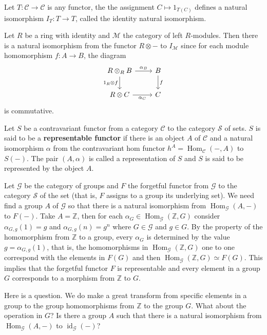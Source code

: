 \documentclass{article}
\DeclareMathOperator{\Hom}{Hom}
\begin{document}
\begin{example}
    Let $T:\mathscr{C}\to \mathscr{C}$ is any functor, the the assignment $C \mapsto 1_{T(C)}$ defines a natural isomorphism $I_T: T\to T$, called the identity natural isomorphism.
\end{example}

\begin{example}
    Let $R$ be a ring with identity and $\mathscr{M}$ the category of left $R$-modules. Then there is a natural isomorphism from the functor $R \otimes -$ to $I_{\mathscr{M}}$ since for each module homomorphism $f:A\to B$, the diagram 
    \begin{equation*}
        \begin{tikzcd}
        R \otimes_R B \arrow[r, "\alpha_B"] \arrow[d, "1_R \otimes f"'] & B \arrow[d, "f"] \\
        R \otimes C \arrow[r, "\alpha_C"']                             & C
        \end{tikzcd}
    \end{equation*}
    is commutative.
\end{example}

\begin{definition}
    Let $S$ be a contravariant functor from a category $\mathscr{C}$ to the category $\mathscr{S}$ of sets. $S$ is said to be a \textbf{representable functor} if there is an object $A$ of $\mathscr{C}$ and a natural isomorphism $\alpha$ from the contravariant hom functor $h^A=\Hom_{\mathscr{C}}(-,A)$ to $S(-)$. The pair $(A,\alpha)$ is called a representation of $S$ and $S$ is said to be represented by the object $A$.
\end{definition}

\begin{example}
    Let $\mathscr{G}$ be the category of groups and $F$ the forgetful functor from $\mathscr{G}$ to the category $\mathscr{S}$ of the set (that is, $F$ assigns to a group its underlying set). We need find a group $A$ of $\mathscr{G}$ so that there is a natural isomorphism from $\Hom_{\mathscr{G}}(A,-)$ to $F(-)$. Take $A=\mathbb{Z}$, then for each $\alpha_G \in \Hom_{\mathscr{G}}(\mathbb{Z},G)$ consider $\alpha_{G,g}(1)=g$ and $\alpha_{G,g}(n)=g^n$ where $G \in \mathscr{G}$ and $g \in G$. By the property of the homomorphism from $\mathbb{Z}$ to a group, every $\alpha_G$ is determined by the value $g=\alpha_{G,g}(1)$, that is, the homomorphisms in $\Hom_{\mathscr{G}}(\mathbb{Z},G)$ one to one correspond with the elements in $F(G)$ and then $\Hom_{\mathscr{G}}(\mathbb{Z},G)\simeq F(G)$. This implies that the forgetful functor $F$ is representable and every element in a group $G$ corresponds to a morphism from $\mathbb{Z}$ to $G$. 
    
    Here is a question. We do make a great transform from specific elements in a group to the group homomorphisms from $\mathbb{Z}$ to the group $G$. What about the operation in $G$? Is there a group $A$ such that there is a natural isomorphism from $\Hom_{\mathscr{G}}(A,-)$ to $\operatorname{id}_{\mathscr{G}}(-)$?
\end{example}
\end{document}
